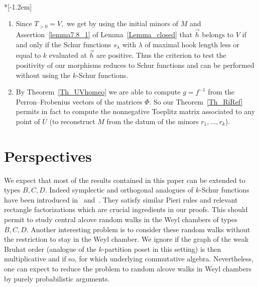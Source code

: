 \documentclass[ALCO,ThmDefs,Unicode,epreuves]{cedram}
\begin{document}
\begin{remas}\label{Rema_redtest}\ \\*[-1.2em]

\begin{enumerate}
\item Since $T_{>0}=V,$ we get by using the initial minors of $M$ and
Assertion~\eqref{lemma7.8_1} of Lemma~\ref{Lemma_closed} that $\vec{h}$ belongs to $V$ if and
only if the Schur functions $s_{\lambda}$ with $\lambda$ of maximal hook
length less or equal to $k$ evaluated at $\vec{h}$ are positive. Thus the
criterion to test the positivity of our morphisms reduces to Schur functions
and can be performed without using the $k$-Schur functions.

\item By Theorem~\ref{Th_UVhomeo} we are able to compute $g=f^{-1}$ from the
Perron--Frobenius vectors of the matrices $\Phi$. So our Theorem~\ref{Th_RiRef}
permits in fact to compute the nonnegative Toeplitz matrix associated to any
point of $\overline{U}$ (\ie to reconstruct $M$ from the datum of the minors
$r_{1},\ldots,r_{k}$).
\end{enumerate}
\end{remas}

\section{Perspectives}\label{section8}
We expect that most of the results contained in this paper can be extended to types $B,C,D$. 
Indeed symplectic and orthogonal analogues of $k$-Schur functions have been introduced in~\cite{LSS} and~\cite{P}. 
They satisfy similar Pieri rules and relevant rectangle factorizations which are crucial 
ingredients in our proofs. This should permit to study central alcove random walks in the Weyl chambers of types $B,C,D$.
Another interesting problem is to consider these random walks without the restriction to stay in the Weyl chamber. 
We ignore if the graph of the weak Bruhat order (analogue of the $k$-partition poset in this setting) is then multiplicative and 
if so, for which underlying commutative algebra. Nevertheless, one can expect to reduce the problem to 
random alcove walks in Weyl chambers by purely probabilistic arguments.



 


\nocite{*}


\end{document}
